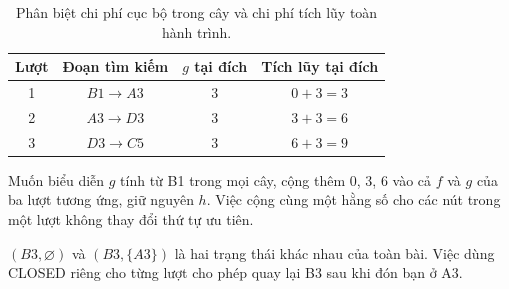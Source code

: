 \begin{table}[ht!]
    \centering
    \caption{Phân biệt chi phí cục bộ trong cây và chi phí tích lũy toàn hành trình.}
    \renewcommand{\arraystretch}{1.3}
    \begin{tabular}{c c c c}
        \toprule
        \textbf{Lượt} & \textbf{Đoạn tìm kiếm} & \textbf{$g$ tại đích} & \textbf{Tích lũy tại đích} \\
        \midrule
        1 & $B1\to A3$ & 3 & $0+3=3$ \\
        2 & $A3\to D3$ & 3 & $3+3=6$ \\
        3 & $D3\to C5$ & 3 & $6+3=9$ \\
        \bottomrule
    \end{tabular}
\end{table}

Muốn biểu diễn $g$ tính từ B1 trong mọi cây, cộng thêm $0$, $3$, $6$ vào cả $f$ và $g$ của ba lượt tương ứng, giữ nguyên $h$. Việc cộng cùng một hằng số cho các nút trong một lượt không thay đổi thứ tự ưu tiên.

\begin{calloutnote}
    $(B3,\varnothing)$ và $(B3,\{A3\})$ là hai trạng thái khác nhau của toàn bài. Việc dùng CLOSED riêng cho từng lượt cho phép quay lại B3 sau khi đón bạn ở A3.
\end{calloutnote}
